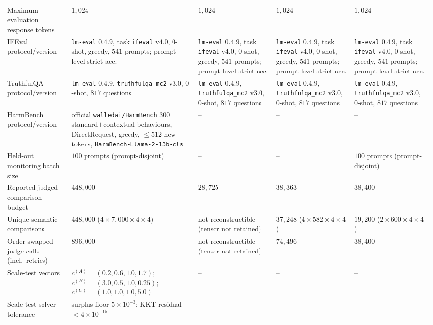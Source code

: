 \documentclass{article}
\theoremstyle{remark}
\theoremstyle{plain}
\begin{document}
\begin{table}[t]
\begin{tabular}{@{}p{}p{}p{}p{}p{}@{}}
Maximum evaluation response tokens & $1{,}024$ & $1{,}024$ & $1{,}024$ & $1{,}024$ \\
IFEval protocol/version & \texttt{lm-eval} $0.4.9$, task \texttt{ifeval} v$4.0$, $0$-shot, greedy, $541$ prompts; prompt-level strict acc. & \texttt{lm-eval} $0.4.9$, task \texttt{ifeval} v$4.0$, $0$-shot, greedy, $541$ prompts; prompt-level strict acc. & \texttt{lm-eval} $0.4.9$, task \texttt{ifeval} v$4.0$, $0$-shot, greedy, $541$ prompts; prompt-level strict acc. & \texttt{lm-eval} $0.4.9$, task \texttt{ifeval} v$4.0$, $0$-shot, greedy, $541$ prompts; prompt-level strict acc. \\
TruthfulQA protocol/version & \texttt{lm-eval} $0.4.9$, \texttt{truthfulqa\_mc2} v$3.0$, $0$-shot, $817$ questions & \texttt{lm-eval} $0.4.9$, \texttt{truthfulqa\_mc2} v$3.0$, $0$-shot, $817$ questions & \texttt{lm-eval} $0.4.9$, \texttt{truthfulqa\_mc2} v$3.0$, $0$-shot, $817$ questions & \texttt{lm-eval} $0.4.9$, \texttt{truthfulqa\_mc2} v$3.0$, $0$-shot, $817$ questions \\
HarmBench protocol/version & official \texttt{walledai/\allowbreak HarmBench} $300$ standard$+$contextual behaviours, DirectRequest, greedy, $\le512$ new tokens, \texttt{HarmBench-\allowbreak Llama-2-\allowbreak 13b-cls} & -- & -- & -- \\
Held-out monitoring batch size & $100$ prompts (prompt-disjoint) & -- & -- & $100$ prompts (prompt-disjoint) \\
Reported judged-comparison budget & $448{,}000$ & $28{,}725$ & $38{,}363$ & $38{,}400$ \\
Unique semantic comparisons & $448{,}000$ ($4\times7{,}000\times4\times4$) & not reconstructible (tensor not retained) & $37{,}248$ ($4\times582\times4\times4$) & $19{,}200$ ($2\times600\times4\times4$) \\
Order-swapped judge calls (incl.\ retries) & $896{,}000$ & not reconstructible (tensor not retained) & $74{,}496$ & $38{,}400$ \\
Scale-test vectors & $c^{(A)}=(0.2,0.6,1.0,1.7)$; $c^{(B)}=(3.0,0.5,1.0,0.25)$; $c^{(C)}=(1.0,1.0,1.0,5.0)$ & -- & -- & -- \\
Scale-test solver tolerance & surplus floor $5\times10^{-3}$; KKT residual $<4\times10^{-15}$ & -- & -- & -- \\
\bottomrule
\end{tabular}
\end{table}
\end{document}
